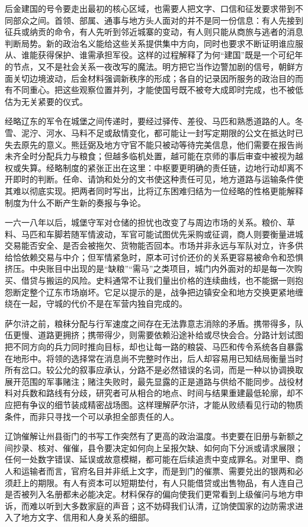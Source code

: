 后金建国的号令要走出最初的核心区域，也需要人把文字、口信和征发要求带到不同部众之间。首领、部属、通事与地方头人面对的并不是同一份信息：有人先接到征兵或纳贡的命令，有人先听到邻近城寨的变动，有人则只能从商旅与逃者的消息判断局势。新的政治名义能给这些关系提供集中方向，同时也要求不断证明谁应服从、谁能获得保护、谁需承担军役。这样的过程解释了为何“建国”既是一个可纪年的节点，又不是社会关系一夜改写的魔法。明方把它当作边警加剧的信号，朝鲜方面关切边境波动，后金材料强调新秩序的形成；各自的记录因所服务的政治目的而有不同重心。把这些观察位置并列，才能使国号既不被夸大成即时完成，也不被低估为无关紧要的仪式。

经略辽东的军令在城堡之间传递时，要经过驿传、差役、马匹和熟悉道路的人。冬雪、泥泞、河水、马料不足或敌情变化，都可能让一封写定期限的公文在抵达时已失去原先的意义。熊廷弼及地方守官不能只被动等待完美信息，他们需要在报告尚未齐全时分配兵力与粮食；但越多临机处置，越可能在京师的事后审查中被视为越权或失算。经略制度的紧张正出在这里：中枢要更明确的责任链，边地行动却离不开即时的判断。任命、请饷和处分的文书使这种责任可见，地方道路与运输条件使其难以彻底实现。把两者同时写出，比将辽东困难归结为一位经略的性格更能解释制度为什么不断产生新的奏报与争论。

一六一八年以后，城堡守军对仓储的担忧也改变了与周边市场的关系。粮价、草料、马匹和车脚若随军情波动，军官可能试图优先采购或征调，商人则要衡量进城交易能否安全、是否会被拖欠、货物能否回本。市场并非永远与军队对立，许多供给恰依赖交易与中介；但军情紧急时，原本可讨价还价的关系更容易被命令和恐惧挤压。中央账目中出现的是“缺粮”“需马”之类项目，城门内外面对的却是每一次购买、借贷与搬运的风险。史料通常不让我们量出价格的连续曲线，也不能据一则抱怨断定整个辽东市场崩坏。它足以提示的是，战争把边镇安全和地方交换更紧地缠绕在一起，守城的代价不是在军营内独自完成的。

萨尔浒之前，粮秣分配与行军速度之间存在无法靠意志消除的矛盾。携带得多，队伍更慢、道路更拥挤；携带得少，则需要依赖沿途补给或尽快会合。分路计划试图把不同方向的兵力同时推向目标，却也让每一路的粮袋、马匹和传令系统各自暴露在地形中。将领的选择常在消息尚不完整时作出，后人却容易用已知结局衡量当时所有岔口。较公允的叙事应承认，分路不是必然错误的名词，而是一种以协调换取展开范围的军事赌注；赌注失败时，最先显露的正是道路与供给不能同步。战役材料对兵数和路线有分歧，研究者可从相合的地点、时间与结果重建最低轮廓，却不应把有争议的细节装成精密战场图。这样理解萨尔浒，才能从败绩看见行动的物质条件，而非只寻找一个可以承担全部责任的人。

辽饷催解让州县衙门的书写工作突然有了更高的政治温度。书吏要在旧册与新额之间抄录、核对、催催，县令要决定如何向上呈报欠缺、如何向下分派或请求展限；任何一处数字错误、延误或故意模糊，都可能在后续追责中变成罪名。对里甲、商人和运输者而言，官府名目并非纸上文字，而是到门的催票、需要兑出的银两和必须赶上的期限。有人有资本可以短期垫付，有人只能借贷或出售物品，有人连自己是否被列入名册都未必能决定。材料保存的偏向使我们更常看到上级催问与地方申诉，而难以听到大多数家庭的声音；这不妨碍我们认清，辽饷使国家的边防需求进入了地方文字、信用和人身关系的细部。

